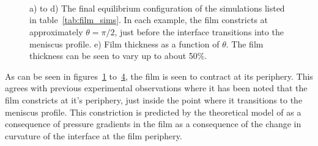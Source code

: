 {    \begin{figure}
      \centering
      \begin{subfigure}[b]{0.225\textwidth}
        \resizebox{\textwidth}{!}{\Huge }
        \caption{}
        \label{fig:float1}
      \end{subfigure}
      ~
      \begin{subfigure}[b]{0.225\textwidth}
        \resizebox{\textwidth}{!}{\Huge }
        \caption{}
        \label{fig:float2}
      \end{subfigure}
      ~
      \begin{subfigure}[b]{0.225\textwidth}
        \resizebox{\textwidth}{!}{\Huge }
        \caption{}
        \label{fig:float3}
      \end{subfigure}
      ~
      \begin{subfigure}[b]{0.225\textwidth}
        \resizebox{\textwidth}{!}{\Huge }
        \caption{}
        \label{fig:float4}
      \end{subfigure}

      \begin{subfigure}[b]{0.9\textwidth}
        \resizebox{\textwidth}{!}{\normalsize }
        \caption{}
        \label{fig:film_prof}
      \end{subfigure}
      \caption{a) to d) The final equilibrium configuration of the simulations listed in table~\ref{tab:film_sims}. In each example, the film constricts at approximately $\theta = \pi / 2$, just before the interface transitions into the meniscus profile. e) Film thickness as a function of $\theta$. The film thickness can be seen to vary up to about 50\%.}\label{fig:float_films}
    \end{figure}

As can be seen in figures~\ref{fig:float1} to~\ref{fig:float4}, the film is seen to contract at its periphery. This agrees with previous experimental observations \citep{Hartland68} where it has been noted that the film constricts at it's periphery, just inside the point where it transitions to the meniscus profile. This constriction is predicted by the theoretical model of \citep{Jones78} as a consequence of pressure gradients in the film as a consequence of the change in curvature of the interface at the film periphery. 

}
